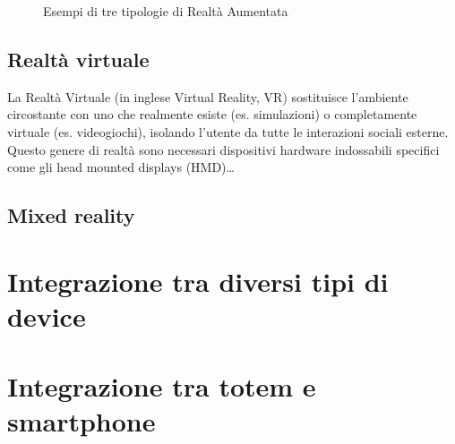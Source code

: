 \begin{figure} [h]
    \centering
    \caption{Esempi di tre tipologie di Realtà Aumentata} 
    \label{fig:ARbased_type}
\end{figure}


\subsection{Realtà virtuale}
La Realtà Virtuale (in inglese Virtual Reality, VR) sostituisce l'ambiente circostante con uno che realmente esiste (es. simulazioni) o completamente virtuale (es. videogiochi), isolando l'utente da tutte le interazioni sociali esterne. Questo genere di realtà sono necessari dispositivi hardware indossabili specifici come gli head mounted displays (HMD)\dots

\subsection{Mixed reality}

%
\section{Integrazione tra diversi tipi di device}
\section{Integrazione tra totem e smartphone}